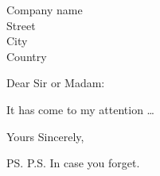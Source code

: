 \documentclass{letter}
\begin{document}
\begin{letter}{Company name \\ Street\\ City\\ Country} %

\opening{Dear Sir or Madam:}
It has come to my attention \dots
\closing{Yours Sincerely,}

\ps{P.S. In case you forget.}

\end{letter}
\end{document}
